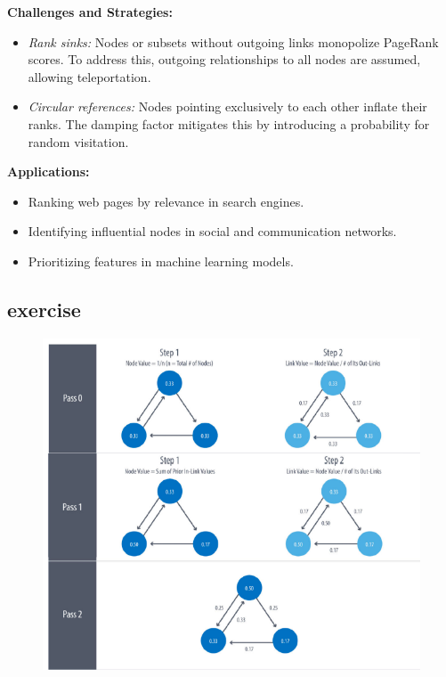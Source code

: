 \textbf{Challenges and Strategies:}
\begin{itemize}
    \item \textit{Rank sinks:} Nodes or subsets without outgoing links monopolize PageRank scores. To address this, outgoing relationships to all nodes are assumed, allowing teleportation.
    \item \textit{Circular references:} Nodes pointing exclusively to each other inflate their ranks. The damping factor mitigates this by introducing a probability for random visitation.
\end{itemize}

\textbf{Applications:}
\begin{itemize}
    \item Ranking web pages by relevance in search engines.
    \item Identifying influential nodes in social and communication networks.
    \item Prioritizing features in machine learning models.
\end{itemize}

\subsection{exercise}
\begin{figure}[h!]
    \centering
    \includegraphics[width=0.75\linewidth]{immagini/pagerank.png}
\end{figure}

\newpage


